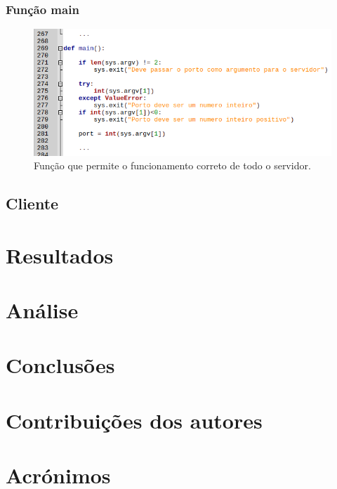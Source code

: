 \documentclass{report}
\begin{document}
\subsection{Função \textbf{main}}
\begin{figure}[H]
	\centering
	\includegraphics[scale=0.65]{main}	
	\caption{Função que permite o funcionamento correto de todo o servidor.}
\end{figure}

\section{Cliente}



\chapter{Resultados}
\label{chap.resultados}

\chapter{Análise}
\label{chap.analise}


\chapter{Conclusões}
\label{chap.conclusao}

\chapter*{Contribuições dos autores}


\chapter*{Acrónimos}


\printbibliography
\end{document}
